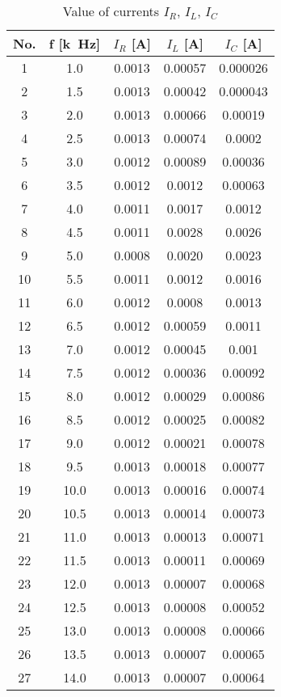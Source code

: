 \begin{table}[hptb]
	\centering
	\caption{Value of currents $I_R$, $I_L$, $I_C$}
	\label{tab:tab1}
	\begin{tabular}{|c|c|c|c|c|}
		\hline
		No. & f [\unit{k\hertz}] & $I_R$ [\unit{\ampere}] & $I_L$ [\unit{\ampere}] & $I_C$ [\unit{\ampere}]\\   
		\hline
		1& 1.0 & 0.0013 & 0.00057 & 0.000026\\
		\hline
		2& 1.5 & 0.0013 & 0.00042 & 0.000043\\
		\hline
		3& 2.0 & 0.0013 & 0.00066 & 0.00019\\
		\hline
		4& 2.5 & 0.0013 & 0.00074 & 0.0002\\
		\hline
        5& 3.0 & 0.0012 & 0.00089 & 0.00036\\
		\hline
        6& 3.5 & 0.0012 & 0.0012 & 0.00063\\
		\hline
        7& 4.0 & 0.0011 & 0.0017 & 0.0012\\
		\hline
        8& 4.5 & 0.0011 & 0.0028 & 0.0026\\
		\hline
        9& 5.0 & 0.0008 & 0.0020 & 0.0023\\
		\hline
        10& 5.5 & 0.0011 & 0.0012 & 0.0016\\
		\hline
        11& 6.0 & 0.0012 & 0.0008 & 0.0013\\
		\hline
        12& 6.5 & 0.0012 & 0.00059 & 0.0011\\
		\hline
        13& 7.0 & 0.0012 & 0.00045 & 0.001\\
		\hline
        14& 7.5 & 0.0012 & 0.00036 & 0.00092\\
		\hline
        15& 8.0 & 0.0012 & 0.00029 & 0.00086\\
		\hline
        16& 8.5 & 0.0012 & 0.00025 & 0.00082\\
		\hline
        17& 9.0 & 0.0012 & 0.00021 & 0.00078\\
		\hline
        18& 9.5 & 0.0013 & 0.00018 & 0.00077\\
		\hline
        19& 10.0 & 0.0013 & 0.00016 & 0.00074\\
		\hline
        20& 10.5 & 0.0013 & 0.00014 & 0.00073\\
		\hline
        21& 11.0 & 0.0013 & 0.00013 & 0.00071\\
		\hline
        22& 11.5 & 0.0013 & 0.00011 & 0.00069\\
		\hline
        23& 12.0 & 0.0013 & 0.00007 & 0.00068\\
		\hline
        24& 12.5 & 0.0013 & 0.00008 & 0.00052\\
		\hline
        25& 13.0 & 0.0013 & 0.00008 & 0.00066\\
		\hline
        26& 13.5 & 0.0013 & 0.00007 & 0.00065\\
		\hline
        27& 14.0 & 0.0013 & 0.00007 & 0.00064\\
		\hline
	\end{tabular}
\end{table}